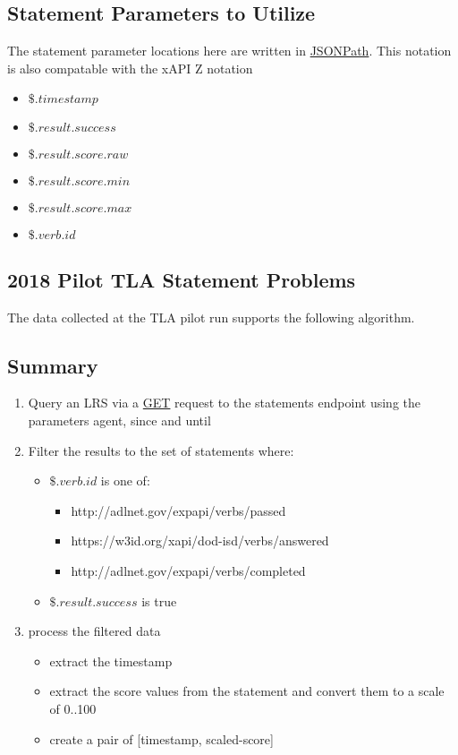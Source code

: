 \documentclass{article}
\begin{document}
\subsection{Statement Parameters to Utilize}
The statement parameter locations here are written in
\href{http://goessner.net/articles/JsonPath/}{JSONPath}. This notation
is also compatable with the xAPI Z notation
\begin{itemize}
\item $\$.timestamp$
\item $\$.result.success$
\item $\$.result.score.raw$
\item $\$.result.score.min$
\item $\$.result.score.max$
\item $\$.verb.id$
\end{itemize}

\subsection{2018 Pilot TLA Statement Problems}
The data collected at the TLA pilot run supports the following
algorithm.

\subsection{Summary}
\begin{enumerate}
\item Query an LRS via a \href{https://github.com/adlnet/xAPI-Spec/blob/master/xAPI-Communication.md#213-get-statements}{GET} request to the statements endpoint using the parameters agent, since and until
\item Filter the results to the set of statements where:
  \begin{itemize}
  \item $\$.verb.id$ is one of:
    \begin{itemize}
    \item http://adlnet.gov/expapi/verbs/passed
    \item https://w3id.org/xapi/dod-isd/verbs/answered
    \item http://adlnet.gov/expapi/verbs/completed
    \end{itemize}
  \item $\$.result.success$ is true
  \end{itemize}
\item process the filtered data
  \begin{itemize}
  \item extract the timestamp
  \item extract the score values from the statement and convert them
    to a scale of 0..100
  \item create a pair of [timestamp, scaled-score]
  \end{itemize}
\end{enumerate}
\end{document}
